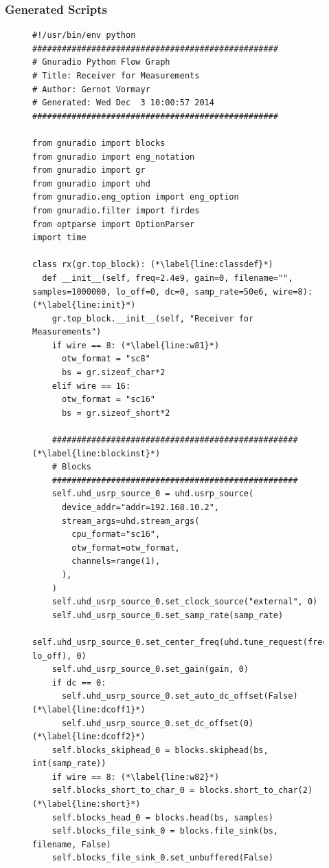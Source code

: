 \documentclass[12pt,a4paper,parskip=full,abstracton]{scrartcl}
\begin{document}
\subsubsection{Generated Scripts}
\label{sec:radioscripts}
\begin{figure}[htbp]
    \centering
    \begin{lstlisting}[basicstyle=\tiny,caption={Generated RX flowgraph module with modifications ({\ttfamily rx\_final.py)}},label=lst:rxfinal.py]
#!/usr/bin/env python
##################################################
# Gnuradio Python Flow Graph
# Title: Receiver for Measurements
# Author: Gernot Vormayr
# Generated: Wed Dec  3 10:00:57 2014
##################################################

from gnuradio import blocks
from gnuradio import eng_notation
from gnuradio import gr
from gnuradio import uhd
from gnuradio.eng_option import eng_option
from gnuradio.filter import firdes
from optparse import OptionParser
import time

class rx(gr.top_block): (*\label{line:classdef}*)
  def __init__(self, freq=2.4e9, gain=0, filename="", samples=1000000, lo_off=0, dc=0, samp_rate=50e6, wire=8): (*\label{line:init}*)
    gr.top_block.__init__(self, "Receiver for Measurements")
    if wire == 8: (*\label{line:w81}*)
      otw_format = "sc8"
      bs = gr.sizeof_char*2
    elif wire == 16:
      otw_format = "sc16"
      bs = gr.sizeof_short*2

    ################################################## (*\label{line:blockinst}*)
    # Blocks
    ##################################################
    self.uhd_usrp_source_0 = uhd.usrp_source(
      device_addr="addr=192.168.10.2",
      stream_args=uhd.stream_args(
        cpu_format="sc16",
        otw_format=otw_format,
        channels=range(1),
      ),
    )
    self.uhd_usrp_source_0.set_clock_source("external", 0)
    self.uhd_usrp_source_0.set_samp_rate(samp_rate)
    self.uhd_usrp_source_0.set_center_freq(uhd.tune_request(freq, lo_off), 0)
    self.uhd_usrp_source_0.set_gain(gain, 0)
    if dc == 0:
      self.uhd_usrp_source_0.set_auto_dc_offset(False) (*\label{line:dcoff1}*)
      self.uhd_usrp_source_0.set_dc_offset(0)          (*\label{line:dcoff2}*)
    self.blocks_skiphead_0 = blocks.skiphead(bs, int(samp_rate))
    if wire == 8: (*\label{line:w82}*)
    self.blocks_short_to_char_0 = blocks.short_to_char(2) (*\label{line:short}*)
    self.blocks_head_0 = blocks.head(bs, samples)
    self.blocks_file_sink_0 = blocks.file_sink(bs, filename, False)
    self.blocks_file_sink_0.set_unbuffered(False)


\end{lstlisting}
\end{figure}
\end{document}
